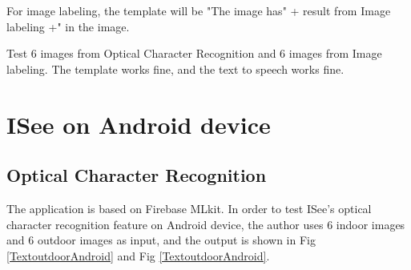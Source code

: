 \documentclass[11pt]{ucscthesis}
\begin{document}
For image labeling, the template will be "The image has" + result from Image labeling +" in the image.

Test 6 images from Optical Character Recognition and 6 images from Image labeling. The template works fine, and the text to speech works fine.


\section{ISee on Android device}


\subsection{Optical Character Recognition}
The application is based on Firebase MLkit. 
In order to test ISee's optical character recognition feature on Android device, the author uses 6 indoor images and 6 outdoor images as input, and the output is shown in Fig \ref{TextoutdoorAndroid} and Fig \ref{TextoutdoorAndroid}.
\end{document}
